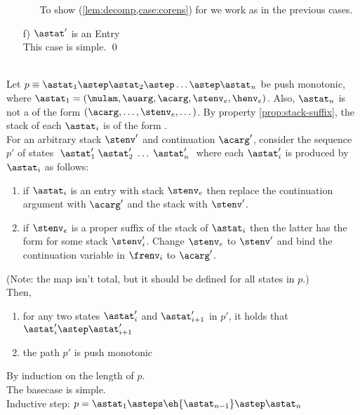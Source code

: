 \documentclass{LMCS}
\theoremstyle{definition} \newtheorem{property}[thm]{Property}
\begin{document}
\begin{enumerate}[$\bullet$]
\begin{enumerate}[$\bullet$]
    To show (\ref{lem:decomp,case:corens}) for \astat{} 
    we work as in the previous cases.
  \end{enumerate}
\item[f)]
  $\astat'$ is an Entry \\
  This case is simple.
  \qed
\end{enumerate}

\begin{lem}\label{lem:stack-irrel}  ~\\
  Let $p \equiv \astat_1 \astep \astat_2 \astep \dots \astep \astat_n$
  be push monotonic,
  where $\astat_1 = (\mulam, \auarg, \acarg, \stenv_e, \henv_e)$.
  Also, $\astat_n$ is not a \dacapply{} of the form 
  $(\acarg, \dots, \stenv_e, \dots)$.
  By property \ref{prop:stack-suffix}, the stack of each $\astat_i$ is of the
  form .
  \\
  For an arbitrary stack $\stenv'$ and continuation $\acarg'$, 
  consider the sequence $p'$ of states 
  $\; \astat_1' \; \astat_2' \; \dots \; \astat_n' \;$ 
  where each $\astat_i'$ is produced by $\astat_i$ as follows:
  \begin{enumerate}[$\bullet$]
  \item 
    if $\astat_i$ is an entry with stack $\stenv_e$ then replace the 
    continuation argument with $\acarg'$ and the stack with $\stenv'$.
  \item
    if $\stenv_e$ is a proper suffix of the stack of $\astat_i$ then 
    the latter has the form 
    for some stack $\stenv_i'$.
    Change $\stenv_e$ to $\stenv'$ and bind the continuation variable in 
    $\frenv_i$ to $\acarg'$.
  \end{enumerate}
  (Note: the map isn't total, but it should be defined for all states 
  in $p$.) \\
  Then, 
  \begin{enumerate}[$\bullet$]
  \item
    for any two states $\astat_i'$ and $\astat_{i+1}'$ in $p'$, it holds that
    $\astat_i' \astep \astat_{i+1}'$
  \item
    the path $p'$ is push monotonic
  \end{enumerate}
\end{lem}
\newcommand{\astatnmo}{\eh{\astat_{n-1}}}
\proof
By induction on the length of $p$. \\
The basecase is simple. \\
Inductive step:
$p = \astat_1 \asteps \astatnmo \astep \astat_n$ \\
\end{document}
